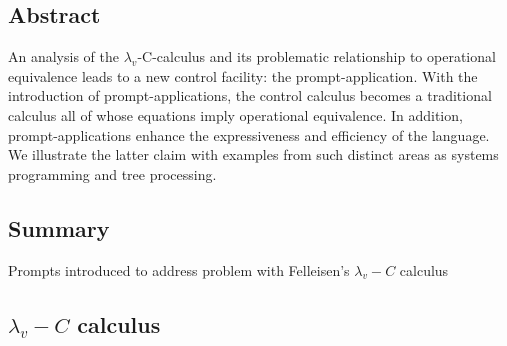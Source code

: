 \documentclass[letterpaper]{llncs}
\newcommand{\lamdavC}{ \ensuremath{ \lambda_v\!\!-\!\!C } }
\begin{document}
\subsection*{Abstract}
An analysis of the $\lambda_v$-C-calculus and its problematic relationship to operational equivalence leads to a new control facility: the prompt-application. With the introduction of prompt-applications, the control calculus becomes a traditional calculus all of whose equations imply operational equivalence. In addition, prompt-applications enhance the expressiveness and efficiency of the language. We illustrate the latter claim with examples from such distinct areas as systems programming and tree processing.

\subsection*{Summary}

Prompts introduced to address problem with Felleisen's $\lambda_v\!\!-\!\!C$ calculus~\cite{Felleisen1987SyntacticTheory}
	
\subsection*{$\lamdavC$ calculus}
\end{document}
